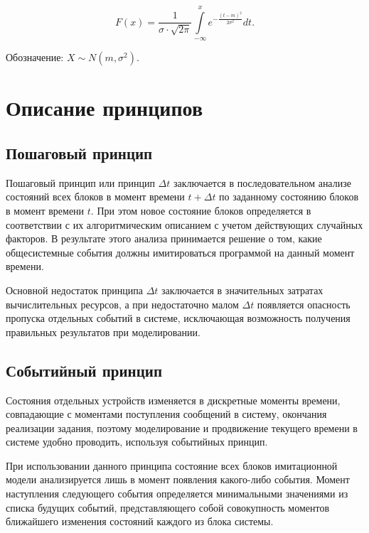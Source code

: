 \begin{equation}
    F(x) = \frac{1}{\sigma \cdot \sqrt{2\pi}} \int\limits_{-\infty}^{x}
    e^{\displaystyle-\frac{(t - m)^2}{2\sigma^2}} dt.
\end{equation}

Обозначение: $X \sim N(m, \sigma^2)$.

\section{Описание принципов}

\subsection{Пошаговый принцип}

Пошаговый принцип или принцип $\Delta t$ заключается в последовательном анализе
состояний всех блоков в момент времени $t + \Delta t$ по заданному состоянию
блоков в момент времени $t$. При этом новое состояние блоков определяется в
соответствии с их алгоритмическим описанием с учетом действующих случайных
факторов. В результате этого анализа принимается решение о том, какие
общесистемные события должны имитироваться программой на данный момент времени.

Основной недостаток принципа $\Delta t$ заключается в значительных затратах
вычислительных ресурсов, а при недостаточно малом $\Delta t$ появляется
опасность пропуска отдельных событий в системе, исключающая возможность
получения правильных результатов при моделировании.

\subsection{Событийный принцип}

Состояния отдельных устройств изменяется в дискретные моменты времени,
совпадающие с моментами поступления сообщений в систему, окончания реализации
задания, поэтому моделирование и продвижение текущего времени в системе удобно
проводить, используя событийных принцип.

При использовании данного принципа состояние всех блоков имитационной модели
анализируется лишь в момент появления какого-либо события. Момент наступления
следующего события определяется минимальными значениями из списка будущих
событий, представляющего собой совокупность моментов ближайшего изменения
состояний каждого из блока системы.
